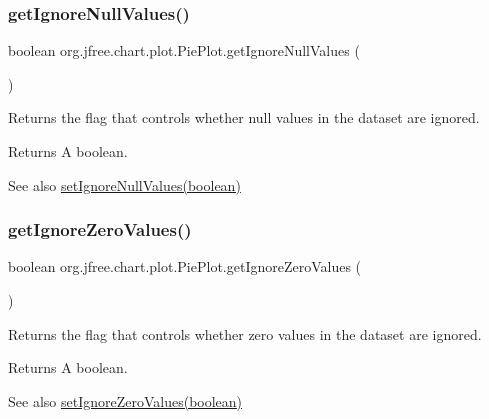 \subsubsection{\texorpdfstring{get\+Ignore\+Null\+Values()}{getIgnoreNullValues()}}
{\footnotesize\ttfamily boolean org.\+jfree.\+chart.\+plot.\+Pie\+Plot.\+get\+Ignore\+Null\+Values (\begin{DoxyParamCaption}{ }\end{DoxyParamCaption})}

Returns the flag that controls whether {\ttfamily null} values in the dataset are ignored.

\begin{DoxyReturn}{Returns}
A boolean.
\end{DoxyReturn}
\begin{DoxySeeAlso}{See also}
\mbox{\hyperlink{classorg_1_1jfree_1_1chart_1_1plot_1_1_pie_plot_a618349ca4f4880ab09be7e6cb5e5c4af}{set\+Ignore\+Null\+Values(boolean)}} 
\end{DoxySeeAlso}
\mbox{\label{classorg_1_1jfree_1_1chart_1_1plot_1_1_pie_plot_a8406857ddf597ed96eee37a8bdb53ba1}} 
\subsubsection{\texorpdfstring{get\+Ignore\+Zero\+Values()}{getIgnoreZeroValues()}}
{\footnotesize\ttfamily boolean org.\+jfree.\+chart.\+plot.\+Pie\+Plot.\+get\+Ignore\+Zero\+Values (\begin{DoxyParamCaption}{ }\end{DoxyParamCaption})}

Returns the flag that controls whether zero values in the dataset are ignored.

\begin{DoxyReturn}{Returns}
A boolean.
\end{DoxyReturn}
\begin{DoxySeeAlso}{See also}
\mbox{\hyperlink{classorg_1_1jfree_1_1chart_1_1plot_1_1_pie_plot_a074921a8b902098b95d1be421c523f1b}{set\+Ignore\+Zero\+Values(boolean)}} 
\end{DoxySeeAlso}
\mbox{\label{classorg_1_1jfree_1_1chart_1_1plot_1_1_pie_plot_a15a41ce0f9505c82aa6f935e10886e8e}} 
